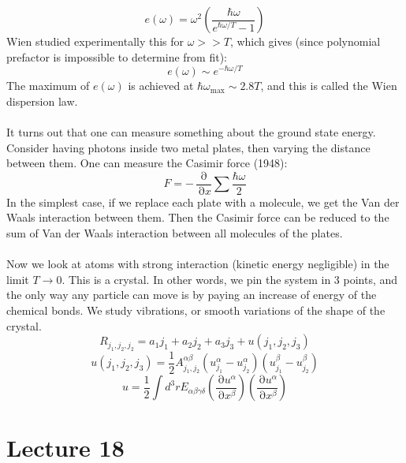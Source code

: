 \documentclass[12 pt]{article}
\DeclareMathOperator {\p} {\partial}
\begin{document}
\[     e(\omega) =  \omega^2 \left( \frac{\hbar \omega}{e^{\hbar \omega/T} - 1} \right)     \]
Wien studied experimentally this for $\omega >> T$, which gives (since polynomial prefactor is impossible to determine from fit):
\[      e(\omega) \sim e^{-\hbar \omega/T}     \]
The maximum of $e(\omega)$ is achieved at $\hbar \omega_{\text{max}} \sim 2.8 T$, and this is called the Wien dispersion law.
\\
\\
It turns out that one can measure something about the ground state energy. Consider having photons inside two metal plates, then varying the distance between them. One can measure the Casimir force (1948):
\[      F = - \frac{\p}{\p x} \sum \frac{\hbar\omega}{2}      \]
In the simplest case, if we replace each plate with a molecule, we get the Van der Waals interaction between them. Then the Casimir force can be reduced to the sum of Van der Waals interaction between all molecules of the plates.
\\
\\
Now we look at atoms with strong interaction (kinetic energy negligible) in the limit $T\to 0$. This is a crystal. In other words, we pin the system in 3 points, and the only way any particle can move is by paying an increase of energy of the chemical bonds. We study vibrations, or smooth variations of the shape of the crystal.
\[        R_{j_1, j_2, j_2} = a_1 j_1 + a_2 j_2 + a_3 j_3 + u(j_1, j_2, j_3)      \]
\[       u(j_1, j_2, j_3) = \frac{1}{2} A^{\alpha \beta}_{j_1, j_2} (u^{\alpha}_{j_1} - u^{\alpha}_{j_2})(u^{\beta}_{j_1} - u^{\beta}_{j_2} )     \]
\[            u = \frac{1}{2} \int d^3r E_{\alpha \beta \gamma \delta} \left( \frac{\p u^{\alpha}}{\p x^{\beta}}  \right) \left(  \frac{\p u^{\alpha}}{\p x^{\beta}}  \right)         \]


\section*{Lecture 18}
\end{document}
